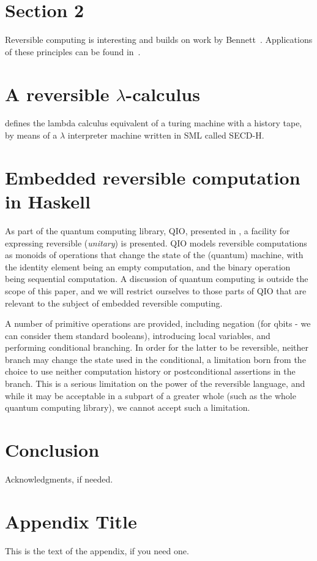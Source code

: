 \documentclass[10pt]{sigplanconf}
\begin{document}
\section{Section 2}
Reversible computing is interesting and builds on work by
Bennett~\cite{Bennett:1982}. Applications of these principles can be found
in~\cite{ThomsenAxelsen:2009:PPL,YokoyamaGlueck:2007:Janus}.


\section{A reversible $\lambda$-calculus}
\cite{huelsbergen1996logically} defines the lambda calculus equivalent of a
turing machine with a history tape, by means of a $\lambda$ interpreter machine written in SML called SECD-H.

\section{Embedded reversible computation in Haskell}

As part of the quantum computing library, QIO, presented in
\cite{altenkirchquantum}, a facility for expressing reversible
(\textit{unitary}) is presented.  QIO models reversible computations
as monoids of operations that change the state of the (quantum)
machine, with the identity element being an empty computation, and the
binary operation being sequential computation.  A discussion of
quantum computing is outside the scope of this paper, and we will
restrict ourselves to those parts of QIO that are relevant to the
subject of embedded reversible computing.

A number of primitive operations are provided, including negation (for
qbits - we can consider them standard booleans), introducing local
variables, and performing conditional branching.  In order for the
latter to be reversible, neither branch may change the state used in
the conditional, a limitation born from the choice to use neither
computation history or postconditional assertions in the branch.  This
is a serious limitation on the power of the reversible language, and
while it may be acceptable in a subpart of a greater whole (such as
the whole quantum computing library), we cannot accept such a
limitation.

\section{Conclusion}




\acks
Acknowledgments, if needed.






\appendix
\section{Appendix Title}

This is the text of the appendix, if you need one.
\end{document}
